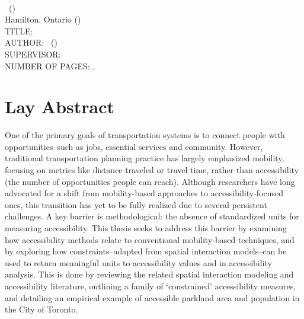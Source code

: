 \documentclass[
11pt, %
oneside, %
english, %
singlespacing, %
]{macthesis} %
\def\blankpage{%
      \clearpage%
      \thispagestyle{empty}%
      \addtocounter{page}{-1}%
      \null%
      \clearpage}
\begin{document}


\blankpage
\clearpage


\newpage
{} %
\setcounter{page}{2} %

\noindent %
\univname \\
\degreename\, (\the\year) \\
Hamilton, Ontario (\deptname) \\[1.5cm]
TITLE: \ttitle \\
AUTHOR: \authorname\,  %
(\univname)  \\
SUPERVISOR: \supname\, \\
NUMBER OF PAGES: \pageref{lastoffront}, \pageref{LastPage}  %

\clearpage

\section*{Lay Abstract}
  One of the primary goals of transportation systems is to connect people with opportunities--such as jobs, essential services and community. However, traditional transportation planning practice has largely emphasized mobility, focusing on metrics like distance traveled or travel time, rather than accessibility (the number of opportunities people can reach). Although researchers have long advocated for a shift from mobility-based approaches to accessibility-focused ones, this transition has yet to be fully realized due to several persistent challenges. A key barrier is methodological: the absence of standardized units for measuring accessibility. This thesis seeks to address this barrier by examining how accessibility methods relate to conventional mobility-based techniques, and by exploring how constraints--adapted from spatial interaction models--can be used to return meaningful units to accessibility values and in accessibility analysis. This is done by reviewing the related spatial interaction modeling and accessibility literature, outlining a family of `constrained' accessibility measures, and detailing an empirical example of accessible parkland area and population in the City of Toronto.
\blankpage
\clearpage
\end{document}
